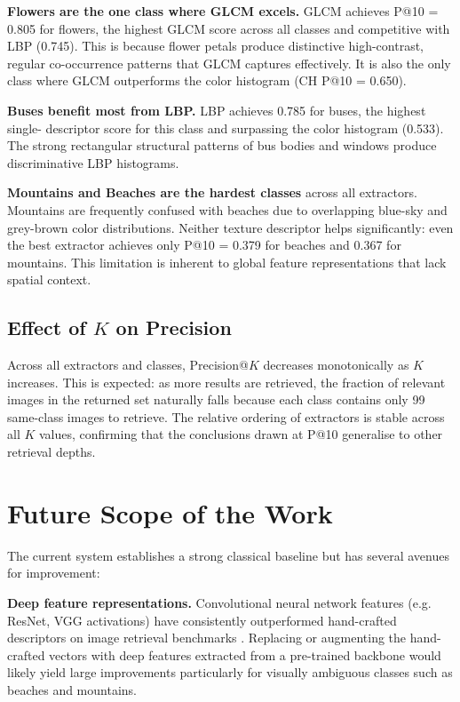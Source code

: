 \documentclass[12pt, a4paper]{article}
\begin{document}
\textbf{Flowers are the one class where GLCM excels.} GLCM achieves P@10 = 0.805 for
flowers, the highest GLCM score across all classes and competitive with LBP (0.745). This
is because flower petals produce distinctive high-contrast, regular co-occurrence patterns
that GLCM captures effectively. It is also the only class where GLCM outperforms the color
histogram (CH P@10 = 0.650).

\textbf{Buses benefit most from LBP.} LBP achieves 0.785 for buses, the highest single-
descriptor score for this class and surpassing the color histogram (0.533). The strong
rectangular structural patterns of bus bodies and windows produce discriminative LBP histograms.

\textbf{Mountains and Beaches are the hardest classes} across all extractors. Mountains
are frequently confused with beaches due to overlapping blue-sky and grey-brown color
distributions. Neither texture descriptor helps significantly: even the best extractor
achieves only P@10 = 0.379 for beaches and 0.367 for mountains. This limitation is
inherent to global feature representations that lack spatial context.

\subsection{Effect of $K$ on Precision}

Across all extractors and classes, Precision@$K$ decreases monotonically as $K$ increases.
This is expected: as more results are retrieved, the fraction of relevant images in the
returned set naturally falls because each class contains only 99 same-class images to
retrieve. The relative ordering of extractors is stable across all $K$ values, confirming
that the conclusions drawn at P@10 generalise to other retrieval depths.

\section{Future Scope of the Work}

The current system establishes a strong classical baseline but has several avenues for
improvement:

\textbf{Deep feature representations.} Convolutional neural network features (e.g. ResNet,
VGG activations) have consistently outperformed hand-crafted descriptors on image retrieval
benchmarks \cite{babenko2014}. Replacing or augmenting the hand-crafted vectors with
deep features extracted from a pre-trained backbone would likely yield large improvements
particularly for visually ambiguous classes such as beaches and mountains.
\end{document}
